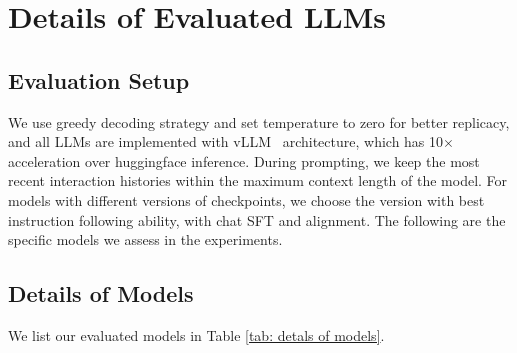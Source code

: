 \section{Details of Evaluated LLMs\label{sec:Details of Evaluated LLMs}}


\subsection{Evaluation Setup}
We use greedy decoding strategy and set temperature to zero for better replicacy, and all LLMs are implemented with vLLM~\citep{kwon2023efficient} architecture, which has 10$\times $ acceleration over huggingface inference. During prompting, we keep the most recent interaction histories within the maximum context length of the model. For models with different versions of checkpoints, we choose the version with best instruction following ability, with chat SFT and alignment. The following are the specific models we assess in the experiments. 
\subsection{Details of Models}

We list our evaluated models in Table \ref{tab: detals of models}. 
